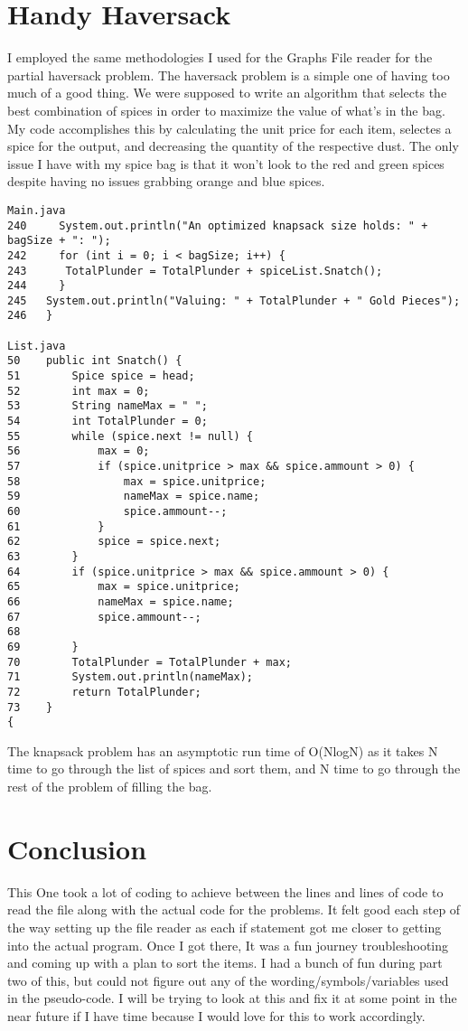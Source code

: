\documentclass{article}
\begin{document}
\section{Handy Haversack}
I employed the same methodologies I used for the Graphs File reader for the partial haversack problem. The haversack problem is a simple one of having too much of a good thing. We were supposed to write an algorithm that selects the best combination of spices in order to maximize the value of what's in the bag. My code accomplishes this by calculating the unit price for each item,  selectes a spice for the output, and decreasing the quantity of the respective dust. The only issue I have with my spice bag is that it won't look to the red and green spices despite having no issues grabbing orange and blue spices.
\begin{verbatim}
Main.java
240     System.out.println("An optimized knapsack size holds: " +  bagSize + ": ");
242     for (int i = 0; i < bagSize; i++) {
243      TotalPlunder = TotalPlunder + spiceList.Snatch();
244     }
245   System.out.println("Valuing: " + TotalPlunder + " Gold Pieces");
246   }

List.java
50    public int Snatch() {
51        Spice spice = head;
52        int max = 0;
53        String nameMax = " ";
54        int TotalPlunder = 0;
55        while (spice.next != null) {
56            max = 0;
57            if (spice.unitprice > max && spice.ammount > 0) {
58                max = spice.unitprice;
59                nameMax = spice.name;
60                spice.ammount--;
61            }
62            spice = spice.next;
63        }
64        if (spice.unitprice > max && spice.ammount > 0) {
65            max = spice.unitprice;
66            nameMax = spice.name;
67            spice.ammount--;
68
69        }
70        TotalPlunder = TotalPlunder + max;
71        System.out.println(nameMax);
72        return TotalPlunder;
73    }
{\end{verbatim}

The knapsack problem has an asymptotic run time  of  O(NlogN) as it takes N time to go through the list of spices and sort them, and N time to go through the rest of the problem of filling the bag.

\section{Conclusion}
This One took a lot of coding to achieve between the lines and lines of code to read the file along with the actual code for the problems. It felt good each step of the way setting up the file reader as each if statement got me closer to getting into the actual program. Once I got there, It was a fun journey troubleshooting and coming up with a plan to sort the items. I had a bunch of fun during part two of this, but could not figure out any of the wording/symbols/variables used in the pseudo-code. I will be trying to look at this and fix it at some point in the near future if I have time because I would love for this to work accordingly.
\end{document}
